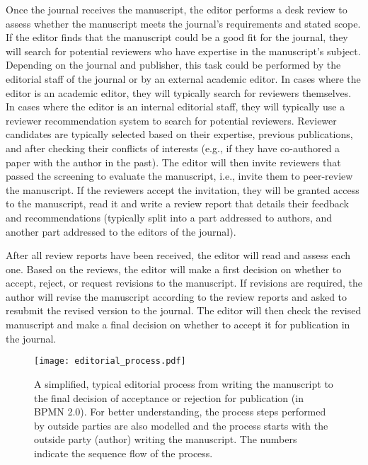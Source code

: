 Once the journal receives the manuscript, the editor performs a desk review to assess whether the manuscript meets the journal's requirements
and stated scope. If the editor finds that the manuscript could be a good fit for the journal, they will search for potential reviewers who
have expertise in the manuscript's subject. Depending on the journal and publisher, this task could be performed by the editorial staff of
the journal or by an external academic editor. In cases where the editor is an academic editor, they will typically search for reviewers
themselves. In cases where the editor is an internal editorial staff, they will typically use a reviewer recommendation system to search
for potential reviewers. Reviewer candidates are typically selected based on their expertise, previous publications, and after checking 
their conflicts of interests (e.g., if they have co-authored a paper with the author in the past). The editor will then invite reviewers
that passed the screening to evaluate the manuscript, i.e., invite them to peer-review the manuscript. If the reviewers accept the invitation,
they will be granted access to the manuscript, read it and write a review report that details their feedback and recommendations (typically
split into a part addressed to authors, and another part addressed to the editors of the journal). 

After all review reports have been received, the editor will read and assess each one. Based on the reviews, the editor will make a first
decision on whether to accept, reject, or request revisions to the manuscript. If revisions are required, the author will revise the manuscript
according to the review reports and asked to resubmit the revised version to the journal. The editor will then check the revised manuscript
and make a final decision on whether to accept it for publication in the journal.

\begin{landscape}
    \begin{figure*}[htb]
        \centering
        \texttt{[image: editorial\_process.pdf]}
        \caption{A simplified, typical editorial process from writing the manuscript to the final decision of acceptance or
        rejection for publication (in BPMN 2.0). For better understanding, the process steps performed by outside parties 
        are also modelled and the process starts with the outside party (author) writing the manuscript. The numbers
        indicate the sequence flow of the process.}
        \label{fig:bpmnEditorialProcess}
    \end{figure*}
\end{landscape}

